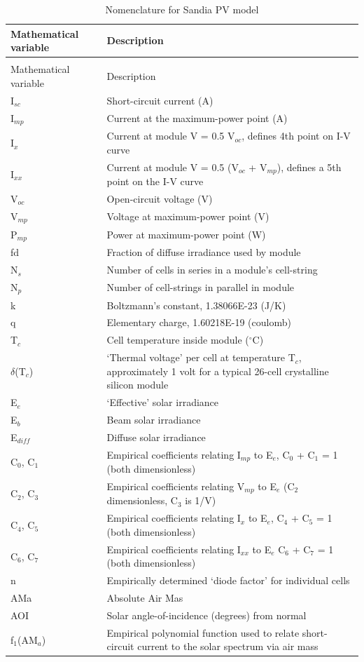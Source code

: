 \begin{longtable}[c]{p{1.2in}p{4.8in}}
\caption{Nomenclature for Sandia PV model \label{table:nomenclature-for-sandia-pv-model}} \tabularnewline
\toprule
Mathematical variable & Description \tabularnewline
\midrule
\endfirsthead

\caption[]{Nomenclature for Sandia PV model} \tabularnewline
\toprule
Mathematical variable & Description \tabularnewline
\midrule
\endhead

I\(_{sc}\) & Short-circuit current (A) \tabularnewline
I\(_{mp}\) & Current at the maximum-power point (A) \tabularnewline
I\(_{x}\) & Current at module V = 0.5 V\(_{oc}\), defines 4th point on I-V curve \tabularnewline
I\(_{xx}\) & Current at module V = 0.5 (V\(_{oc}\) + V\(_{mp}\)), defines a 5th point on the I-V curve \tabularnewline
V\(_{oc}\) & Open-circuit voltage (V) \tabularnewline
V\(_{mp}\) & Voltage at maximum-power point (V) \tabularnewline
P\(_{mp}\) & Power at maximum-power point (W) \tabularnewline
fd & Fraction of diffuse irradiance used by module \tabularnewline
N\(_{s}\) & Number of cells in series in a module’s cell-string \tabularnewline
N\(_{p}\) & Number of cell-strings in parallel in module \tabularnewline
k & Boltzmann’s constant, 1.38066E-23 (J/K) \tabularnewline
q & Elementary charge, 1.60218E-19 (coulomb) \tabularnewline
T\(_{c}\) & Cell temperature inside module (\(^{\circ}\)C) \tabularnewline
$\delta$(T\(_{c}\)) & ‘Thermal voltage’ per cell at temperature T\(_{c}\), approximately 1 volt for a typical 26-cell crystalline silicon module \tabularnewline
E\(_{e}\) & ‘Effective’ solar irradiance \tabularnewline
E\(_{b}\) & Beam solar irradiance \tabularnewline
E\(_{diff}\) & Diffuse solar irradiance \tabularnewline
C\(_{0}\), C\(_{1}\) & Empirical coefficients relating I\(_{mp}\) to E\(_{e}\), C\(_{0}\) + C\(_{1}\) = 1 (both dimensionless) \tabularnewline
C\(_{2}\), C\(_{3}\) & Empirical coefficients relating V\(_{mp}\) to E\(_{e}\) (C\(_{2}\) dimensionless, C\(_{3}\) is 1/V) \tabularnewline
C\(_{4}\), C\(_{5}\) & Empirical coefficients relating I\(_{x}\) to E\(_{e}\), C\(_{4}\) + C\(_{5}\) = 1 (both dimensionless) \tabularnewline
C\(_{6}\), C\(_{7}\) & Empirical coefficients relating I\(_{xx}\) to E\(_{e}\) C\(_{6}\) + C\(_{7}\) = 1 (both dimensionless) \tabularnewline
n & Empirically determined ‘diode factor’ for individual cells \tabularnewline
AMa & Absolute Air Mas \tabularnewline
AOI & Solar angle-of-incidence (degrees) from normal \tabularnewline
f\(_{1}\)(AM\(_{a}\)) & Empirical polynomial function used to relate short-circuit current to the solar spectrum via air mass \tabularnewline

\end{longtable}
